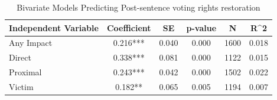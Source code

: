 \begin{table}

\caption{\label{tab:tab:post_felony_vote_rev_bivariate}Bivariate Models Predicting Post-sentence voting rights restoration}
\centering
\begin{tabular}[t]{lccccc}
\toprule
Independent Variable & Coefficient & SE & p-value & N & R\textasciicircum{}2\\
\midrule
Any Impact & 0.216*** & 0.040 & 0.000 & 1600 & 0.018\\
Direct & 0.338*** & 0.081 & 0.000 & 1122 & 0.015\\
Proximal & 0.243*** & 0.042 & 0.000 & 1502 & 0.022\\
Victim & 0.182** & 0.065 & 0.005 & 1194 & 0.007\\
\bottomrule
\end{tabular}
\end{table}
